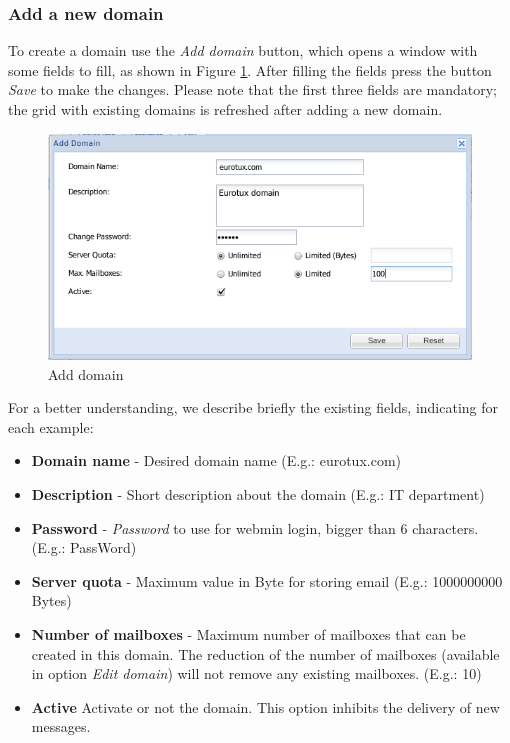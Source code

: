 \subsubsection{Add a new domain}
\label{sec:etms_sub_criacao_dominio}
To create a domain use the \textit{Add domain} button, which opens a window with some fields to fill, as shown in Figure \ref{fig:etms_criar_dominio_2}. After filling the fields press the button \textit{Save} to make the changes. Please note that the first three fields are mandatory; the grid with existing domains is refreshed after adding a new domain.

\begin{figure}[H]
    \begin{center}
    \includegraphics[scale=0.6]{screenshots/etms/etms_criar_dominio_2.png}
    \caption{Add domain}
    \label{fig:etms_criar_dominio_2}
    \end{center}
\end{figure}

For a better understanding, we describe briefly the existing fields, indicating for each example:
\begin{itemize}
\item \textbf{Domain name} - Desired domain name (E.g.: eurotux.com)
\item \textbf{Description} - Short description about the domain (E.g.: IT department)
\item \textbf{Password} - \textit{Password} to use for webmin login, bigger than 6 characters. (E.g.: PassWord)
\item \textbf{Server quota} - Maximum value in Byte for storing email (E.g.: 1000000000 Bytes)
\item \textbf{Number of mailboxes} - Maximum number of mailboxes that can be created in this domain. The reduction of the number of mailboxes (available in option \textit{Edit domain}) will not remove any existing mailboxes. (E.g.: 10)
\item \textbf{Active} Activate or not the domain. This option inhibits the delivery of new messages.
\end{itemize}

